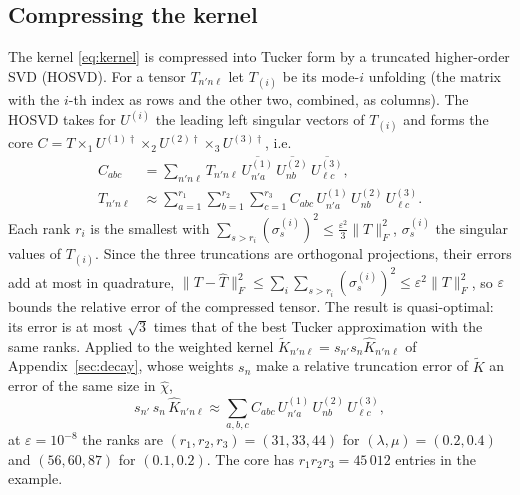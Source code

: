 \documentclass[aps,prb,reprint,a4paper]{revtex4-2}
\begin{document}
\subsection{Compressing the kernel}
\label{sec:tucker}

The kernel \eqref{eq:kernel} is compressed into Tucker form by a truncated higher-order SVD (HOSVD). For a tensor $T_{n'n\ell}$ let $T_{(i)}$ be its mode-$i$ unfolding (the matrix with the $i$-th index as rows and the other two, combined, as columns). The HOSVD takes for $U^{(i)}$ the leading left singular vectors of $T_{(i)}$ and forms the core $C=T\times_1U^{(1)\dagger}\times_2U^{(2)\dagger}\times_3U^{(3)\dagger}$, i.e.
\begin{equation}
  \begin{aligned}
  C_{abc}&=\sum_{n'n\ell}T_{n'n\ell}\,\overline{U^{(1)}_{n'a}}\,\overline{U^{(2)}_{nb}}\,\overline{U^{(3)}_{\ell c}},\\
  T_{n'n\ell}&\approx\sum_{a=1}^{r_1}\sum_{b=1}^{r_2}\sum_{c=1}^{r_3}C_{abc}\,U^{(1)}_{n'a}\,U^{(2)}_{nb}\,U^{(3)}_{\ell c}.
  \end{aligned}
  \label{eq:tucker}
\end{equation}
Each rank $r_i$ is the smallest with $\sum_{s>r_i}(\sigma^{(i)}_s)^2\le\frac{\varepsilon^2}3\lVert T\rVert_F^2$, $\sigma^{(i)}_s$ the singular values of $T_{(i)}$. Since the three truncations are orthogonal projections, their errors add at most in quadrature, $\lVert T-\hat T\rVert_F^2\le\sum_i\sum_{s>r_i}(\sigma^{(i)}_s)^2\le\varepsilon^2\lVert T\rVert_F^2$, so $\varepsilon$ bounds the relative error of the compressed tensor. The result is quasi-optimal: its error is at most $\sqrt3$ times that of the best Tucker approximation with the same ranks. Applied to the weighted kernel $\widetilde K_{n'n\ell}=s_{n'}s_n\widehat K_{n'n\ell}$ of Appendix~\ref{sec:decay}, whose weights $s_n$ make a relative truncation error of $\widetilde K$ an error of the same size in $\hat\chi$,
\begin{equation}
s_{n'}\,s_n\,\widehat K_{n'n\ell}\approx\sum_{a,b,c}C_{abc}\,U^{(1)}_{n'a}\,U^{(2)}_{nb}\,U^{(3)}_{\ell c},
\label{eq:kernel_tucker}
\end{equation}
at $\varepsilon=10^{-8}$ the ranks are $(r_1,r_2,r_3)=(31,33,44)$ for $(\lambda,\mu)=(0.2,0.4)$ and $(56,60,87)$ for $(0.1,0.2)$. The core has $r_1r_2r_3=45\,012$ entries in the example.
\end{document}

